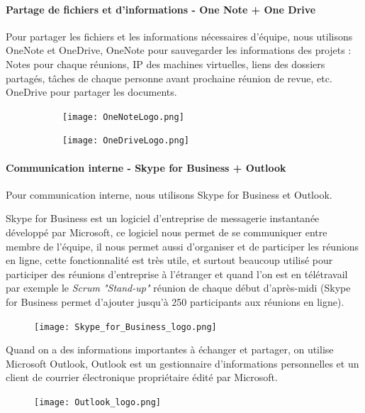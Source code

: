         
        \paragraph{Partage de fichiers et d'informations - One Note + One Drive }
        Pour partager les fichiers et les informations nécessaires d'équipe, nous utilisons OneNote et OneDrive, OneNote pour sauvegarder les informations des projets : Notes pour chaque réunions, IP des machines virtuelles, liens des dossiers partagés, tâches de chaque personne avant prochaine réunion de revue, etc. OneDrive pour partager les documents.
        
        \begin{figure}[H]
            \flushleft
            \begin{subfigure}[b]{.2\textwidth}
                \texttt{[image: OneNoteLogo.png]}
            \end{subfigure}
            \begin{subfigure}[b]{.2\textwidth}
                \texttt{[image: OneDriveLogo.png]}
            \end{subfigure}
            \label{fig:oneNote_oneDrive_label}
        \end{figure}
        
        \paragraph{Communication interne - Skype for Business + Outlook}
        Pour communication interne, nous utilisons Skype for Business et Outlook.
        
        \par Skype for Business est un logiciel d'entreprise de messagerie instantanée développé par Microsoft, ce logiciel nous permet de se communiquer entre membre de l'équipe, il nous permet aussi d'organiser et de participer les réunions en ligne, cette fonctionnalité est très utile, et surtout beaucoup utilisé pour participer des réunions d'entreprise à l'étranger et quand l'on est en télétravail par exemple le \textit{Scrum "Stand-up"} réunion de chaque début d'après-midi (Skype for Business permet d'ajouter jusqu'à 250 participants aux réunions en ligne).
        \begin{figure}[H]
            \flushleft
            \texttt{[image: Skype\_for\_Business\_logo.png]}
            \label{skype_lable}
        \end{figure}
        
        \newpage
        \par Quand on a des informations importantes à échanger et partager, on utilise Microsoft Outlook, Outlook est un gestionnaire d'informations personnelles et un client de courrier électronique propriétaire édité par Microsoft. 
        \begin{figure}[H]
            \flushleft
            \texttt{[image: Outlook\_logo.png]}
            \label{fig:outlook_label}
        \end{figure}
        
